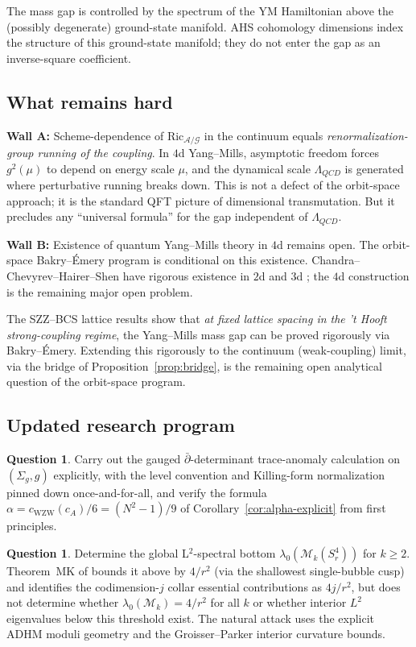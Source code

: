 \documentclass[11pt,letterpaper]{article}
\theoremstyle{definition}
\newtheorem{question}[theorem]{Question}
\newcommand{\cA}{\mathcal{A}}
\newcommand{\cG}{\mathcal{G}}
\newcommand{\cM}{\mathcal{M}}
\newcommand{\Ric}{\mathrm{Ric}}
\begin{document}
The mass gap is controlled by the spectrum of the YM Hamiltonian above the (possibly degenerate) ground-state manifold. AHS cohomology dimensions index the structure of this ground-state manifold; they do not enter the gap as an inverse-square coefficient.

\subsection{What remains hard}

\textbf{Wall A:} Scheme-dependence of $\Ric_{\cA/\cG}$ in the continuum equals \emph{renormalization-group running of the coupling}. In $4$d Yang--Mills, asymptotic freedom forces $g^2(\mu)$ to depend on energy scale $\mu$, and the dynamical scale $\Lambda_{QCD}$ is generated where perturbative running breaks down. This is not a defect of the orbit-space approach; it is the standard QFT picture of dimensional transmutation. But it precludes any ``universal formula'' for the gap independent of $\Lambda_{QCD}$.

\textbf{Wall B:} Existence of quantum Yang--Mills theory in $4$d remains open. The orbit-space Bakry--\'Emery program is conditional on this existence. Chandra--Chevyrev--Hairer--Shen have rigorous existence in $2$d and $3$d \cite{CCHS2022,CCHS2024}; the $4$d construction is the remaining major open problem.

The SZZ--BCS lattice results show that \emph{at fixed lattice spacing in the 't Hooft strong-coupling regime}, the Yang--Mills mass gap can be proved rigorously via Bakry--\'Emery. Extending this rigorously to the continuum (weak-coupling) limit, via the bridge of Proposition~\ref{prop:bridge}, is the remaining open analytical question of the orbit-space program.

\subsection{Updated research program}

\begin{question}\label{q:KKN-curved}
Carry out the gauged $\bar\partial$-determinant trace-anomaly calculation on $(\Sigma_g, g)$ explicitly, with the level convention and Killing-form normalization pinned down once-and-for-all, and verify the formula $\alpha = c_{\mathrm{WZW}}(c_A)/6 = (N^2-1)/9$ of Corollary~\ref{cor:alpha-explicit} from first principles.
\end{question}

\begin{question}\label{q:M2-spectrum}
Determine the global L${}^2$-spectral bottom $\lambda_0(\cM_k(S^4_r))$ for $k \ge 2$. Theorem~MK of \cite{bonfioli-core} bounds it above by $4/r^2$ (via the shallowest single-bubble cusp) and identifies the codimension-$j$ collar essential contributions as $4j/r^2$, but does not determine whether $\lambda_0(\cM_k) = 4/r^2$ for all $k$ or whether interior $L^2$ eigenvalues below this threshold exist. The natural attack uses the explicit ADHM moduli geometry and the Groisser--Parker interior curvature bounds.
\end{question}
\end{document}
